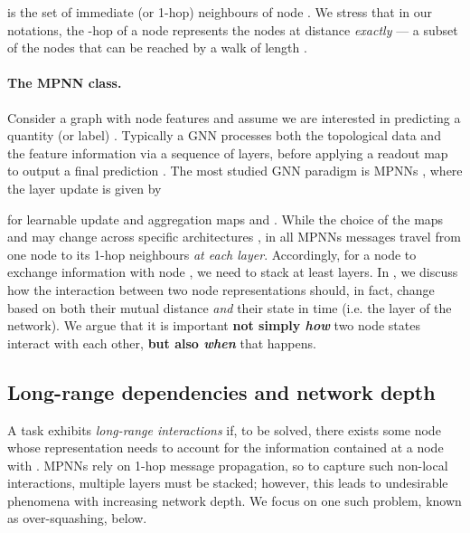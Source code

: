 \documentclass{article}
\theoremstyle{plain}
\theoremstyle{definition}
\theoremstyle{remark}
\begin{document}
\noindent  is the set of
immediate (or 1-hop) neighbours of node .
We stress that in our notations, the -hop of a node  represents the nodes at distance {\em exactly}  --- a subset of the nodes that can be reached by a walk of length . 

\paragraph{The MPNN class.} Consider a graph  with node features  and assume we are interested in predicting a quantity (or label) . Typically a GNN processes both the topological data  and the feature information  via a sequence of layers, before applying a readout map to output a final prediction . The most studied GNN paradigm is MPNNs \cite{gilmer2017neural}, where the layer update is given by

\noindent for learnable update and aggregation maps  and . While the choice of the maps  and  may change across specific architectures \citep{bresson2017residual,hamilton2017inductive,kipf2016semi, velivckovic2017graph}, in all MPNNs messages travel from one node to its 1-hop neighbours {\em at each layer}. Accordingly, for a node  to exchange information with node , we need to stack at least  layers. In , we discuss how the interaction between two node representations should, in fact, change based on both their mutual distance {\em and} their state in time (i.e. the layer of the network). We argue that it is important \textbf{not simply {\em how}} two node states interact with each other, \textbf{but also \textbf{\em when}} that happens. 


\subsection{Long-range dependencies and network depth}

A task exhibits {\em long-range interactions} if, to be solved, there exists some node  whose representation needs to account for the information contained at
a node
 with 
\citep{dwivedi2022long}.
MPNNs rely on 1-hop message propagation, so to capture such non-local interactions, multiple layers must be stacked; however, this leads to undesirable phenomena with increasing network depth. We focus on one such problem, known as over-squashing, below. 
\end{document}
